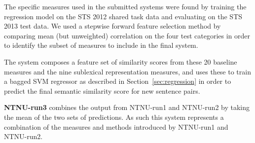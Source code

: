
The specific measures used in the submitted systems were found by training the regression model on the STS 2012 shared task data and evaluating on the STS 2013 test data. We used a stepwise forward feature selection method by comparing mean (but unweighted) correlation on the four test categories in order to identify the subset of measures to include in the final system.

The system composes a feature set of similarity scores from these 20 baseline measures and the nine sublexical representation measures, and uses these to train a bagged SVM regressor as described in Section~\ref{sec:regression} in order to predict the final semantic similarity score for new sentence pairs.

{\bf NTNU-run3} combines the output from NTNU-run1 and NTNU-run2 by taking the mean of the two sets of predictions. 
As such this system represents a combination of the measures and methods introduced by NTNU-run1 and NTNU-run2.


